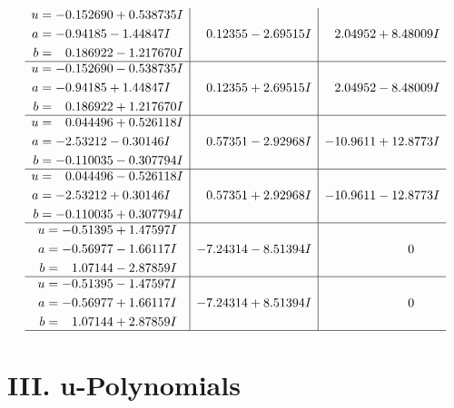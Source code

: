 \documentclass[1p]{elsarticle_modified}
\theoremstyle{definition}
\begin{document}
$$\begin{array}{c|c|c}
\begin{aligned}
u &= -0.152690 + 0.538735 I \\
a &= -0.94185 - 1.44847 I \\
b &= \phantom{-}0.186922 - 1.217670 I\end{aligned}
 & \phantom{-}0.12355 - 2.69515 I & \phantom{-}2.04952 + 8.48009 I \\ \hline\begin{aligned}
u &= -0.152690 - 0.538735 I \\
a &= -0.94185 + 1.44847 I \\
b &= \phantom{-}0.186922 + 1.217670 I\end{aligned}
 & \phantom{-}0.12355 + 2.69515 I & \phantom{-}2.04952 - 8.48009 I \\ \hline\begin{aligned}
u &= \phantom{-}0.044496 + 0.526118 I \\
a &= -2.53212 - 0.30146 I \\
b &= -0.110035 - 0.307794 I\end{aligned}
 & \phantom{-}0.57351 - 2.92968 I & -10.9611 + 12.8773 I \\ \hline\begin{aligned}
u &= \phantom{-}0.044496 - 0.526118 I \\
a &= -2.53212 + 0.30146 I \\
b &= -0.110035 + 0.307794 I\end{aligned}
 & \phantom{-}0.57351 + 2.92968 I & -10.9611 - 12.8773 I \\ \hline\begin{aligned}
u &= -0.51395 + 1.47597 I \\
a &= -0.56977 - 1.66117 I \\
b &= \phantom{-}1.07144 - 2.87859 I\end{aligned}
 & -7.24314 - 8.51394 I & \phantom{-0.000000 } 0 \\ \hline\begin{aligned}
u &= -0.51395 - 1.47597 I \\
a &= -0.56977 + 1.66117 I \\
b &= \phantom{-}1.07144 + 2.87859 I\end{aligned}
 & -7.24314 + 8.51394 I & \phantom{-0.000000 } 0\\
 \hline 
 \end{array}$$\newpage
\newpage\renewcommand{\arraystretch}{1}
\centering \section*{ III. u-Polynomials}
\end{document}
